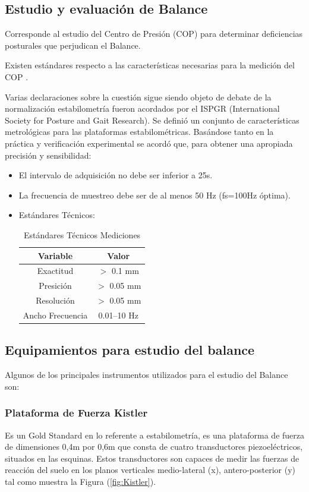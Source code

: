 \documentclass[12pt,a4paper]{article}
\begin{document}
\subsection{Estudio y evaluación de Balance}
Corresponde al estudio del Centro de Presión (COP) para determinar deficiencias posturales que perjudican el Balance.

Existen estándares respecto a las características necesarias para la medición del COP \cite{scoppa_clinical_2013}.

Varias declaraciones sobre la cuestión sigue siendo objeto de debate de la normalización estabilometría fueron acordados por el ISPGR (International Society for Posture and Gait Research).
Se definió un conjunto de características metrológicas para las plataformas estabilométricas.
Basándose tanto en la práctica y verificación experimental se acordó que, para obtener una apropiada precisión y sensibilidad:
\begin{itemize}
	\item El intervalo de adquisición no debe ser inferior a 25s.
	\item La frecuencia de muestreo debe ser de al menos 50 Hz (fs=100Hz óptima).
	\item Estándares Técnicos:
	\begin{table}[H]
		\centering
		\label{table:mediciones}
		\begin{tabular}{|c|c|}			
			\hline \textbf{Variable} & \textbf{Valor} 	\\ 
			\hline Exactitud 	& $>$ 0.1 mm 		\\ 
			\hline Presición 	& $>$ 0.05 mm 		\\ 
			\hline Resolución 	& $>$ 0.05 mm 		\\ 
			\hline Ancho Frecuencia & 0.01–10 Hz	\\ 
			\hline 			
		\end{tabular}
		\caption{Estándares Técnicos Mediciones}
	\end{table}	  
\end{itemize}

\subsection{Equipamientos para estudio del balance} Algunos de los principales instrumentos utilizados para el estudio del Balance son:


\subsubsection{Plataforma de Fuerza Kistler} Es un Gold Standard  en lo referente a estabilometría\cite{donath_testing_2012}, es una plataforma de fuerza de dimensiones
	0,4m por 0,6m que consta de cuatro 	transductores piezoeléctricos, situados en las esquinas. Estos transductores son capaces de medir las fuerzas de reacción del suelo en los planos verticales medio-lateral (x), antero-posterior (y) tal como muestra la Figura (\ref{fig:Kistler}).
\end{document}
